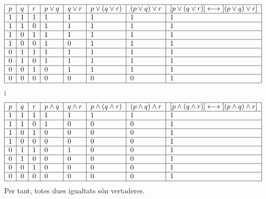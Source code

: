 \begin{solucio}
\begin{equation*}
\begin{tabular}{|l|l|l|l|l|l|l|l|}
\hline
$p$ & $q$ & $r$ & $p\vee q$ & $q\vee r$ & $p\vee (q\vee r)$ & $(p\vee q)\vee
r$ & $\left[ p\vee (q\vee r)\right] \longleftrightarrow \left[ (p\vee q)\vee
r\right] $ \\ \hline
$1$ & $1$ & $1$ & $1$ & $1$ & $1$ & $1$ & $1$ \\ \hline
$1$ & $1$ & $0$ & $1$ & $1$ & $1$ & $1$ & $1$ \\ \hline
$1$ & $0$ & $1$ & $1$ & $1$ & $1$ & $1$ & $1$ \\ \hline
$1$ & $0$ & $0$ & $1$ & $0$ & $1$ & $1$ & $1$ \\ \hline
$0$ & $1$ & $1$ & $1$ & $1$ & $1$ & $1$ & $1$ \\ \hline
$0$ & $1$ & $0$ & $1$ & $1$ & $1$ & $1$ & $1$ \\ \hline
$0$ & $0$ & $1$ & $0$ & $1$ & $1$ & $1$ & $1$ \\ \hline
$0$ & $0$ & $0$ & $0$ & $0$ & $0$ & $0$ & $1$ \\ \hline
\end{tabular}%
\end{equation*}%
i%
\begin{equation*}
\begin{tabular}{|l|l|l|l|l|l|l|l|}
\hline
$p$ & $q$ & $r$ & $p\wedge q$ & $q\wedge r$ & $p\wedge (q\wedge r)$ & $%
(p\wedge q)\wedge r$ & $\left[ p\wedge (q\wedge r)\right]
\longleftrightarrow \left[ (p\wedge q)\wedge r\right] $ \\ \hline
$1$ & $1$ & $1$ & $1$ & $1$ & $1$ & $1$ & $1$ \\ \hline
$1$ & $1$ & $0$ & $1$ & $0$ & $0$ & $0$ & $1$ \\ \hline
$1$ & $0$ & $1$ & $0$ & $0$ & $0$ & $0$ & $1$ \\ \hline
$1$ & $0$ & $0$ & $0$ & $0$ & $0$ & $0$ & $1$ \\ \hline
$0$ & $1$ & $1$ & $0$ & $1$ & $0$ & $0$ & $1$ \\ \hline
$0$ & $1$ & $0$ & $0$ & $0$ & $0$ & $0$ & $1$ \\ \hline
$0$ & $0$ & $1$ & $0$ & $0$ & $0$ & $0$ & $1$ \\ \hline
$0$ & $0$ & $0$ & $0$ & $0$ & $0$ & $0$ & $1$ \\ \hline
\end{tabular}%
\end{equation*}%
Per tant, totes dues igualtats són vertaderes.


\end{solucio}
